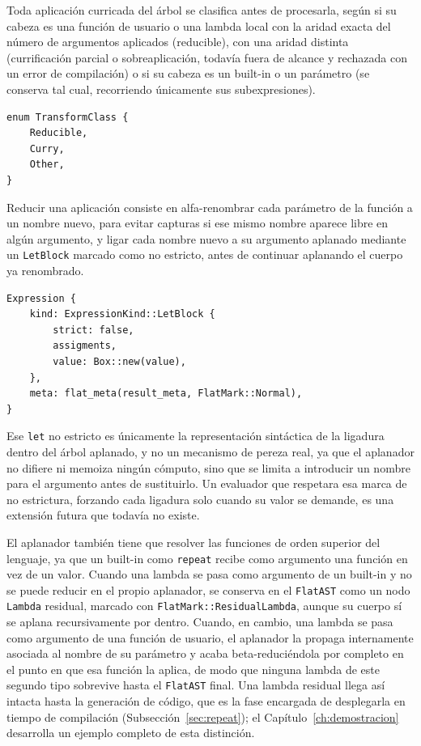 Toda aplicación curricada del árbol se clasifica antes de procesarla, según si su cabeza es una función de usuario o una lambda local con la aridad exacta del número de argumentos aplicados (reducible), con una aridad distinta (currificación parcial o sobreaplicación, todavía fuera de alcance y rechazada con un error de compilación) o si su cabeza es un built-in o un parámetro (se conserva tal cual, recorriendo únicamente sus subexpresiones).

\begin{lstlisting}[language={}, caption=Clasificación de una aplicación antes de aplanarla]
enum TransformClass {
    Reducible,
    Curry,
    Other,
}
\end{lstlisting}

Reducir una aplicación consiste en alfa-renombrar cada parámetro de la función a un nombre nuevo, para evitar capturas si ese mismo nombre aparece libre en algún argumento, y ligar cada nombre nuevo a su argumento aplanado mediante un \lstinline|LetBlock| marcado como no estricto, antes de continuar aplanando el cuerpo ya renombrado.

\begin{lstlisting}[language={}, caption=Ligadura de argumentos tras alfa-renombrar los parámetros]
Expression {
    kind: ExpressionKind::LetBlock {
        strict: false,
        assigments,
        value: Box::new(value),
    },
    meta: flat_meta(result_meta, FlatMark::Normal),
}
\end{lstlisting}

Ese \lstinline|let| no estricto es únicamente la representación sintáctica de la ligadura dentro del árbol aplanado, y no un mecanismo de pereza real, ya que el aplanador no difiere ni memoiza ningún cómputo, sino que se limita a introducir un nombre para el argumento antes de sustituirlo. Un evaluador que respetara esa marca de no estrictura, forzando cada ligadura solo cuando su valor se demande, es una extensión futura que todavía no existe.

El aplanador también tiene que resolver las funciones de orden superior del lenguaje, ya que un built-in como \lstinline|repeat| recibe como argumento una función en vez de un valor. Cuando una lambda se pasa como argumento de un built-in y no se puede reducir en el propio aplanador, se conserva en el \lstinline|FlatAST| como un nodo \lstinline|Lambda| residual, marcado con \lstinline|FlatMark::ResidualLambda|, aunque su cuerpo sí se aplana recursivamente por dentro. Cuando, en cambio, una lambda se pasa como argumento de una función de usuario, el aplanador la propaga internamente asociada al nombre de su parámetro y acaba beta-reduciéndola por completo en el punto en que esa función la aplica, de modo que ninguna lambda de este segundo tipo sobrevive hasta el \lstinline|FlatAST| final. Una lambda residual llega así intacta hasta la generación de código, que es la fase encargada de desplegarla en tiempo de compilación (Subsección~\ref{sec:repeat}); el Capítulo~\ref{ch:demostracion} desarrolla un ejemplo completo de esta distinción.

